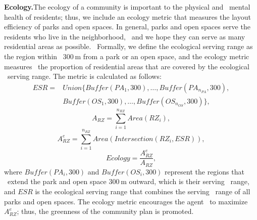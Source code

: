 \textbf{Ecology.}The ecology of a community is important to the physical and \
mental health of residents; thus, we include an ecology metric that 
measures the layout efficiency of parks and open spaces. In general, 
parks and open spaces serve the residents who live in the neighborhood, \
and we hope they can serve as many residential areas as possible. \
Formally, we define the ecological serving range as the region within \
300 m from a park or an open space, and the ecology metric measures \
the proportion of residential areas that are covered by the ecological \
serving range. The metric is calculated as follows:
\begin{equation}
    \begin{aligned}
        ESR = & Union\{Buffer(PA_1,300),\dots,Buffer(PA_{n_{PA}},300),\\
        & Buffer(OS_1,300),\dots,Buffer(OS_{n_{OS}},300)\},\label{ecological-serving-range}
    \end{aligned}
\end{equation}
\begin{equation}
    A_{RZ} = \sum_{i=1}^{n_{RZ}}Area(RZ_i),\label{all-residential-areas}
\end{equation}
\begin{equation}
    A_{RZ}^e = \sum_{i=1}^{n_{RZ}}Area(Intersection(RZ_i,ESR)),\label{intersection-between-all-parks-and-open-spaces}
\end{equation}
\begin{equation}
    Ecology = \frac{A_{RZ}^e}{A_{RZ}},\label{ecology}
\end{equation}
where $Buffer(PA_i,300)$ and $Buffer(OS_i,300)$ represent the regions that \
extend the park and open space 300 m outward, which is their serving \
range, and $ESR$ is the ecological serving range that combines the serving \
range of all parks and open spaces. The ecology metric encourages the agent \
to maximize $A^e_{RZ}$; thus, the greenness of the community plan is promoted.

